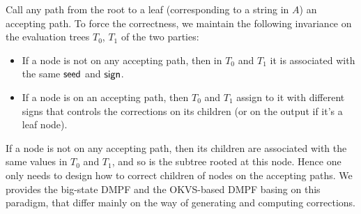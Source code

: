 Call any path from the root to a leaf (corresponding to a string in $A$) an accepting path. To force the correctness, we maintain the following invariance on the evaluation trees $T_0$, $T_1$ of the two parties: 
\begin{itemize}
  \item If a node is not on any accepting path, then in $T_0$ and $T_1$ it is associated with the same ${\sf seed}$ and ${\sf sign}$. 
  \item If a node is on an accepting path, then $T_0$ and $T_1$ assign to it with different signs that controls the corrections on its children (or on the output if it's a leaf node). 
\end{itemize}
If a node is not on any accepting path, then its children are associated with the same values in $T_0$ and $T_1$, and so is the subtree rooted at this node. Hence one only needs to design how to correct children of nodes on the accepting paths. We provides the big-state DMPF and the OKVS-based DMPF basing on this paradigm, that differ mainly on the way of generating and computing corrections. 


